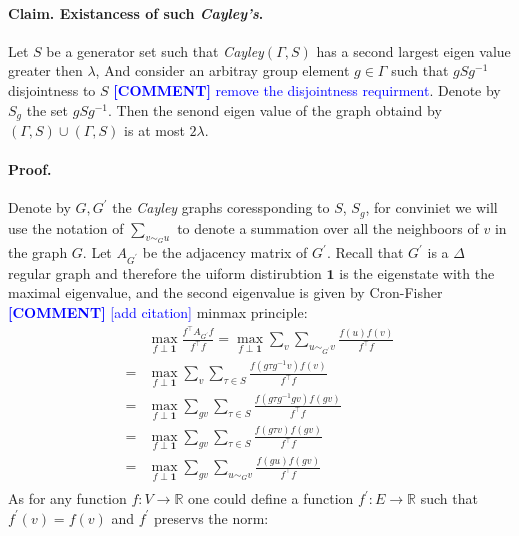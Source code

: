 \documentclass{article}
\newcommand{\commentt}[1]{\textcolor{blue}{ \textbf{[COMMENT]} #1}}
\newcommand{\ctt}[1]{\commentt{#1}}
\begin{document}
\begin{multicols*}{2}
  \paragraph{Claim. Existancess of such \emph{Cayley's}.} Let $S$ be a generator set such that \emph{Cayley}$\left( \Gamma , S \right)$ has a second largest eigen value greater then $\lambda$, And consider an arbitray group element $g \in \Gamma$ such that $gSg^{-1}$ disjointness to $S$ \ctt{ remove the disjointness requirment}. Denote by $S_{g}$ the set $gSg^{-1}$. Then the senond eigen value of the graph obtaind by $\left( \Gamma , S \right) \cup \left( \Gamma , S \right)$ is at most $2\lambda$. 
  \paragraph{Proof.} Denote by $G,G^{\prime}$ the \emph{Cayley} graphs coressponding to $S$, $S_{g}$, for conviniet we will use the notation of $\sum_{v\sim_{G} u}$ to denote a summation over all the neighboors of $v$ in the graph $G$. Let $A_{G^{\prime}}$ be the adjacency matrix of $G^{\prime}$. Recall that $G^{\prime}$ is a  $\Delta$ regular graph and therefore the uiform distirubtion $\mathbf{1}$ is the eigenstate with the maximal eigenvalue, and the second eigenvalue is given by Cron-Fisher\ctt{[add citation]}  minmax principle: 
  \begin{equation*}
    \begin{split}
      & \max_{f \perp \mathbf{1}} { \frac{f^{\top}A_{G^{\prime}} f  }{ f^{\top}f}} = \max_{f \perp \mathbf{1}} { \sum_{v}  \sum_{u\sim_{G^{\prime}} v}\frac{f\left( u \right) f \left( v \right)  }{ f^{\top}f}} \\
      =  & \max_{f \perp \mathbf{1}} { \sum_{v}\sum_{\tau \in S} \frac{f\left( g\tau g^{-1} v \right) f \left( v \right)  }{ f^{\top}f}} \\ = & \max_{f \perp \mathbf{1}} { \sum_{gv} \sum_{\tau \in S}\frac{f\left( g\tau g^{-1} gv \right) f \left( gv \right)  }{ f^{\top}f}} \\  
      = & \max_{f \perp \mathbf{1}} { \sum_{gv}\sum_{\tau \in S}\frac{f\left( g \tau v \right) f \left( g v \right)  }{ f^{\top}f}} \\  = & \max_{f \perp \mathbf{1}} { \sum_{gv}\sum_{ u\sim_{G} v }\frac{f\left( gu \right) f \left( gv \right)  }{ f^{\top}f}} \\
         \end{split}
  \end{equation*}
  As for any function $f : V \rightarrow \mathbb{R} $ one could define a function $f^{\prime} : E \rightarrow \mathbb{R} $ such that $f^{\prime}\left( v \right) = f\left( v \right) $ and $f^{\prime}$ preservs the norm:    

\end{multicols*}
\end{document}
